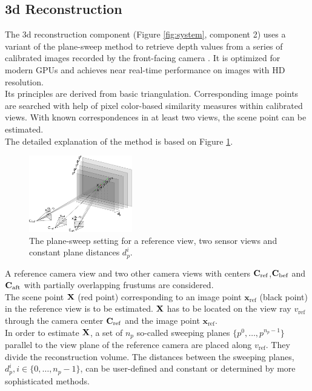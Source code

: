 \documentclass[conference]{IEEEtran}
\newcommand{\ico}[1]{\mathbf{#1}}
\newcommand{\sco}[1]{\uppercase{\mathbf{#1}}}
\begin{document}
\subsection {3d Reconstruction}
\label{ch:3drec}
The 3d reconstruction component (Figure \ref{fig:system}, component 2) uses a variant of the plane-sweep method to retrieve depth values from a series of calibrated images recorded by the front-facing camera \cite{Collins96}. 
It is optimized for modern GPUs and achieves near real-time performance on images with HD resolution.
\\
Its principles are derived from basic triangulation. 
Corresponding image points are searched with help of pixel color-based similarity measures within calibrated views.
With known correspondences in at least two views, the scene point can be estimated.
\\
The detailed explanation of the method is based on Figure \ref{fig:planesweep}.
\begin{figure}[!htbp]
	\centering
	\includegraphics[width=0.40\textwidth]{figures/planesweep}
	\caption{
		The plane-sweep setting for a reference view, two sensor views and constant plane distances $d_p^i$.}\label{fig:planesweep}
\end{figure}
A reference camera view and two other camera views with centers $\sco{C}_{\text{ref}}$,$\sco{C}_{\text{bef}}$ and $\sco{C}_{\text{aft}}$ with partially overlapping frustums are considered.
\\
The scene point $\sco{x}$ (red point) corresponding to an image point $\ico{x}_{\text{ref}}$ (black point) in the reference view is to be estimated.
$\sco{x}$ has to be located on the view ray $v_{\text{ref}}$ through the camera center $\sco{C}_{\text{ref}}$ and the image point $\ico{x}_{\text{ref}}$.
\\
In order to estimate $\sco{x}$, a set of $n_p$ so-called sweeping planes $\{p^0,\ldots,p^{n_p-1}\}$ parallel to the view plane of the reference camera are placed along $v_{\text{ref}}$.
They divide the reconstruction volume.
The distances between the sweeping planes, $d_p^i, i\in\{0,\ldots,n_p-1\}$, can be user-defined and constant or determined by more sophisticated methods. 
\end{document}
